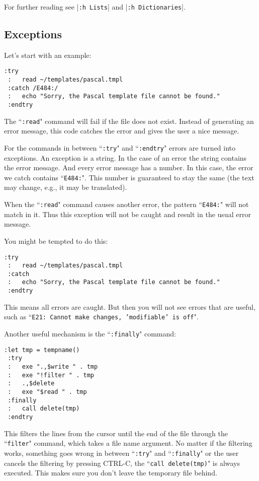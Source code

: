 For further reading see |\texttt{:h Lists}| and |\texttt{:h Dictionaries}|.
\subsection{Exceptions}
Let's start with an example:

\begin{Verbatim}[samepage=true]
 :try
 :   read ~/templates/pascal.tmpl
 :catch /E484:/
 :   echo "Sorry, the Pascal template file cannot be found."
 :endtry
\end{Verbatim}

The ``\texttt{:read}" command will fail if the file does not exist.
Instead of generating an error message, this code catches the error and gives the user a nice message.

For the commands in between ``\texttt{:try}" and ``\texttt{:endtry}" errors are turned into exceptions.
An exception is a string.
In the case of an error the string contains the error message.
And every error message has a number.
In this case, the error we catch contains ``\texttt{E484:}".
This number is guaranteed to stay the same (the text may change, e.g., it may be translated).

When the ``\texttt{:read}" command causes another error, the pattern ``\texttt{E484:}" will not match in it.
Thus this exception will not be caught and result in the usual error message.

You might be tempted to do this:

\begin{Verbatim}[samepage=true]
 :try
 :   read ~/templates/pascal.tmpl
 :catch
 :   echo "Sorry, the Pascal template file cannot be found."
 :endtry
\end{Verbatim}

This means all errors are caught.
But then you will not see errors that are useful, such as ``\texttt{E21: Cannot make changes, 'modifiable' is off}".

Another useful mechanism is the ``\texttt{:finally}" command:

\begin{Verbatim}[samepage=true]
 :let tmp = tempname()
 :try
 :   exe ".,$write " . tmp
 :   exe "!filter " . tmp
 :   .,$delete
 :   exe "$read " . tmp
 :finally
 :   call delete(tmp)
 :endtry
\end{Verbatim}

This filters the lines from the cursor until the end of the file through the ``\texttt{filter}" command, which takes a file name argument.
No matter if the filtering works, something goes wrong in between ``\texttt{:try}" and ``\texttt{:finally}" or the user cancels the filtering by pressing CTRL-C, the ``\texttt{call delete(tmp)}" is always executed.
This makes sure you don't leave the temporary file behind.

